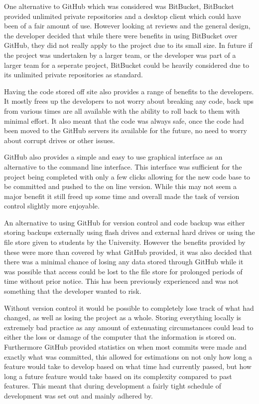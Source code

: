 One alternative to GitHub which was considered was BitBucket, BitBucket provided unlimited private repositories and a desktop client which could have been of a fair amount of use. However looking at reviews and the general design, the developer decided that while there were benefits in using BitBucket over GitHub, they did not really apply to the project due to its small size. In future if the project was undertaken by a larger team, or the developer was part of a larger team for a seperate project, BitBucket could be heavily considered due to its unlimited private repositories as standard. 

Having the code stored off site also provides a range of benefits to the developers. It mostly frees up the developers to not worry about breaking any code, back ups from various times are all available with the ability to roll back to them with minimal effort. It also meant that the code was always safe, once the code had been moved to the GitHub servers its available for the future, no need to worry about corrupt drives or other issues. 

GitHub also provides a simple and easy to use graphical interface as an alternative to the command line interface. This interface was sufficient for the project being completed with only a few clicks allowing for the new code base to be committed and pushed to the on line version. While this may not seem a major benefit it still freed up some time and overall made the task of version control slightly more enjoyable. 

An alternative to using GitHub for version control and code backup was either storing backups externally using flash drives and external hard drives or using the file store given to students by the University. However the benefits provided by these were more than covered by what GitHub provided, it was also decided that there was a minimal chance of losing any data stored through GitHub while it was possible that access could be lost to the file store for prolonged periods of time without prior notice. This has been previously experienced and was not something that the developer wanted to risk.

Without version control it would be possible to completely lose track of what had changed, as well as losing the project as a whole. Storing everything locally is extremely bad practice as any amount of extenuating circumstances could lead to either the loss or damage of the computer that the information is stored on. Furthermore GitHub provided statistics on when most commits were made and exactly what was committed, this allowed for estimations on not only how long a feature would take to develop based on what time had currently passed, but how long a future feature would take based on its complexity compared to past features. This meant that during development a fairly tight schedule of development was set out and mainly adhered by.
